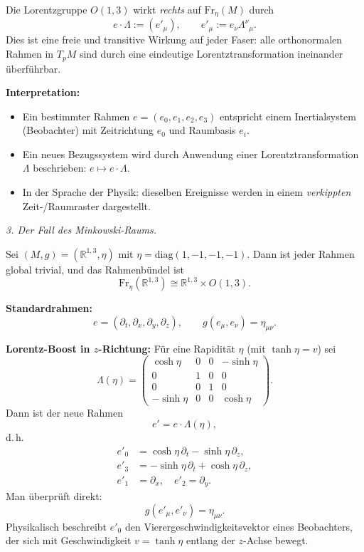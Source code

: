 \documentclass[10pt, letterpaper]{article}
\newcommand{\R}{\mathbb{R}}
\begin{document}
Die Lorentzgruppe $O(1,3)$ wirkt \emph{rechts} auf $\mathrm{Fr}_\eta(M)$ durch
\[
e \cdot \Lambda := (e'_\mu), \qquad e'_\mu := e_\nu \Lambda^\nu{}_\mu.
\]
Dies ist eine freie und transitive Wirkung auf jeder Faser:
alle orthonormalen Rahmen in $T_pM$ sind durch eine eindeutige
Lorentztransformation ineinander überführbar.

\textbf{Interpretation:}
\begin{itemize}
  \item Ein bestimmter Rahmen $e=(e_0,e_1,e_2,e_3)$ entspricht einem 
  Inertialsystem (Beobachter) mit Zeitrichtung $e_0$ und Raumbasis $e_i$.
  \item Ein neues Bezugssystem wird durch Anwendung einer Lorentztransformation 
  $\Lambda$ beschrieben: $e\mapsto e\cdot\Lambda$.
  \item In der Sprache der Physik: dieselben Ereignisse werden 
  in einem \emph{verkippten} Zeit-/Raumraster dargestellt.
\end{itemize}

\bigskip
\emph{3. Der Fall des Minkowski-Raums.}

Sei $(M,g)=(\R^{1,3},\eta)$ mit $\eta=\mathrm{diag}(1,-1,-1,-1)$.
Dann ist jeder Rahmen global trivial, und das Rahmenbündel ist
\[
\mathrm{Fr}_\eta(\R^{1,3}) \cong \R^{1,3}\times O(1,3).
\]

\textbf{Standardrahmen:}
\[
e = (\partial_t, \partial_x, \partial_y, \partial_z),
\qquad
g(e_\mu,e_\nu)=\eta_{\mu\nu}.
\]

\textbf{Lorentz-Boost in $z$-Richtung:}
Für eine Rapidität $\eta$ (mit $\tanh\eta=v$) sei
\[
\Lambda(\eta)
=
\begin{pmatrix}
\cosh\eta & 0 & 0 & -\sinh\eta\\
0 & 1 & 0 & 0\\
0 & 0 & 1 & 0\\
-\sinh\eta & 0 & 0 & \cosh\eta
\end{pmatrix}.
\]
Dann ist der neue Rahmen
\[
e' = e \cdot \Lambda(\eta),
\]
d.\,h.
\[
\begin{aligned}
e'_0 &= \cosh\eta\,\partial_t - \sinh\eta\,\partial_z,\\
e'_3 &= -\sinh\eta\,\partial_t + \cosh\eta\,\partial_z,\\
e'_1 &= \partial_x,\quad e'_2=\partial_y.
\end{aligned}
\]
Man überprüft direkt:
\[
g(e'_\mu,e'_\nu)=\eta_{\mu\nu}.
\]
Physikalisch beschreibt $e'_0$ den Vierergeschwindigkeitsvektor eines Beobachters,
der sich mit Geschwindigkeit $v=\tanh\eta$ entlang der $z$-Achse bewegt.
\end{document}
